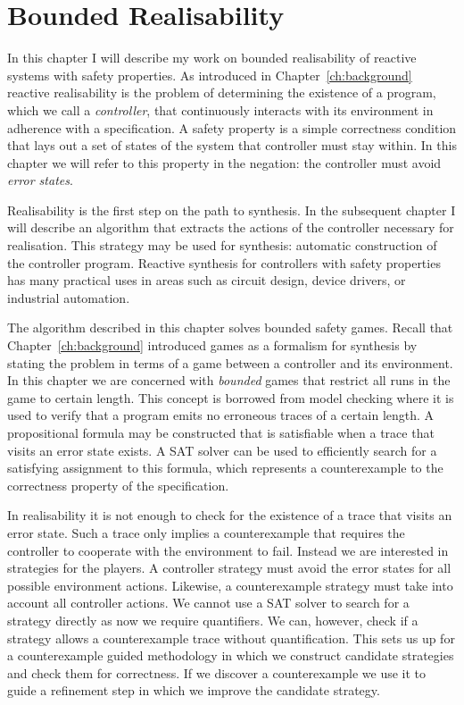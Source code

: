 \chapter{Bounded Realisability}
\label{ch:bounded}

\newtheorem*{exmp}{Example}
\newtheorem*{exmpI}{Example: Intuition behind the algorithm}

In this chapter I will describe my work on bounded realisability of reactive systems with safety properties. As introduced in Chapter~\ref{ch:background} reactive realisability is the problem of determining the existence of a program, which we call a \emph{controller}, that continuously interacts with its environment in adherence with a specification. A safety property is a simple correctness condition that lays out a set of states of the system that controller must stay within. In this chapter we will refer to this property in the negation: the controller must avoid \emph{error states}.

Realisability is the first step on the path to synthesis. In the subsequent chapter I will describe an algorithm that extracts the actions of the controller necessary for realisation. This strategy may be used for synthesis: automatic construction of the controller program. Reactive synthesis for controllers with safety properties has many practical uses in areas such as circuit design, device drivers, or industrial automation.

The algorithm described in this chapter solves bounded safety games. Recall that Chapter~\ref{ch:background} introduced games as a formalism for synthesis by stating the problem in terms of a game between a controller and its environment. In this chapter we are concerned with \emph{bounded} games that restrict all runs in the game to certain length. This concept is borrowed from model checking where it is used to verify that a program emits no erroneous traces of a certain length. A propositional formula may be constructed that is satisfiable when a trace that visits an error state exists. A SAT solver can be used to efficiently search for a satisfying assignment to this formula, which represents a counterexample to the correctness property of the specification. 

In realisability it is not enough to check for the existence of a trace that visits an error state. Such a trace only implies a counterexample that requires the controller to cooperate with the environment to fail. Instead we are interested in strategies for the players. A controller strategy must avoid the error states for all possible environment actions. Likewise, a counterexample strategy must take into account all controller actions. We cannot use a SAT solver to search for a strategy directly as now we require quantifiers. We can, however, check if a strategy allows a counterexample trace without quantification. This sets us up for a counterexample guided methodology in which we construct candidate strategies and check them for correctness. If we discover a counterexample we use it to guide a refinement step in which we improve the candidate strategy.

